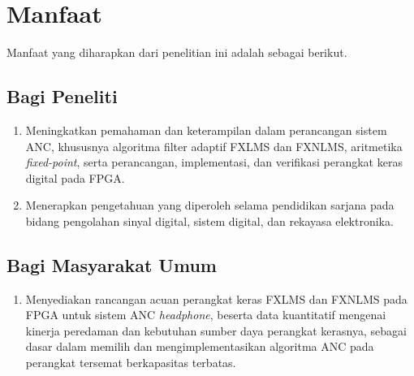 \section{Manfaat}
\label{sec:manfaat}

Manfaat yang diharapkan dari penelitian ini adalah sebagai berikut.

\subsection{Bagi Peneliti}
\label{sec:manfaat_peneliti}

\begin{enumerate}
  \item Meningkatkan pemahaman dan keterampilan dalam perancangan sistem ANC, khususnya algoritma filter adaptif FXLMS dan FXNLMS, aritmetika \emph{fixed-point}, serta perancangan, implementasi, dan verifikasi perangkat keras digital pada FPGA.
  \item Menerapkan pengetahuan yang diperoleh selama pendidikan sarjana pada bidang pengolahan sinyal digital, sistem digital, dan rekayasa elektronika.
\end{enumerate}

\subsection{Bagi Masyarakat Umum}
\label{sec:manfaat_masyarakat}

\begin{enumerate}
  \item Menyediakan rancangan acuan perangkat keras FXLMS dan FXNLMS pada FPGA untuk sistem ANC \emph{headphone}, beserta data kuantitatif mengenai kinerja peredaman dan kebutuhan sumber daya perangkat kerasnya, sebagai dasar dalam memilih dan mengimplementasikan algoritma ANC pada perangkat tersemat berkapasitas terbatas.
\end{enumerate}